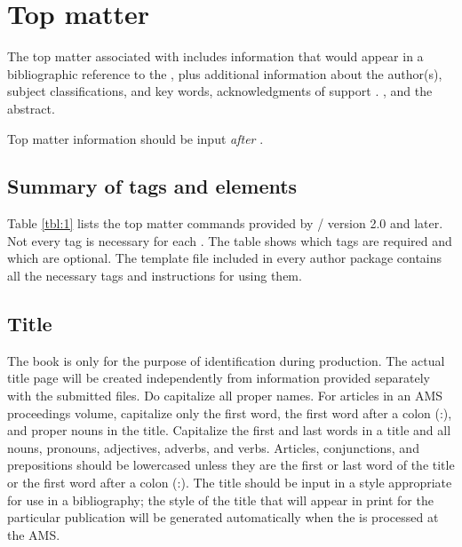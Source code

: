 
\section{Top matter}\label{s:topmatter}

The top matter associated with
 includes
information that would appear in a bibliographic reference to the
,
plus additional information about the author(s), subject classifications,
\ifmonograph
 and
\else
 key words,
\fi acknowledgments of support%
\ifmonograph .
\else
 , and the abstract.
\fi

Top matter information should be input \emph{after} \verb++.

\subsection{Summary of tags and elements}
Table \ref{tbl:1} lists the top matter commands provided by \amslatex/
version 2.0 and later.  Not every tag is necessary for each
.
The table shows which tags are required and which are optional.
The template file included in every author package contains
all the necessary tags and instructions for using them.


\ifjournal
 
\else \ifmonograph
 
\else \ifproceedings
 
\else %
 
\fi\fi\fi

\subsection{Title}
%
{The book  is only for the purpose of identification during
 production.  The actual title page will be created independently from
 information provided separately with the submitted files.  Do capitalize
 all proper names.}
{For articles in an AMS proceedings volume, capitalize only the first
 word, the first word after a colon (:), and proper nouns in the title.}
{Capitalize the first and last words in a title and all nouns, pronouns,
 adjectives, adverbs, and verbs.  Articles, conjunctions, and prepositions
 should be lowercased unless they are the first or last word of the title
 or the first word after a colon (:).}
The title should be input in a style appropriate for use in a bibliography;
the style of the title that will appear in print for the particular
publication will be generated automatically when the
 is processed at the AMS.

